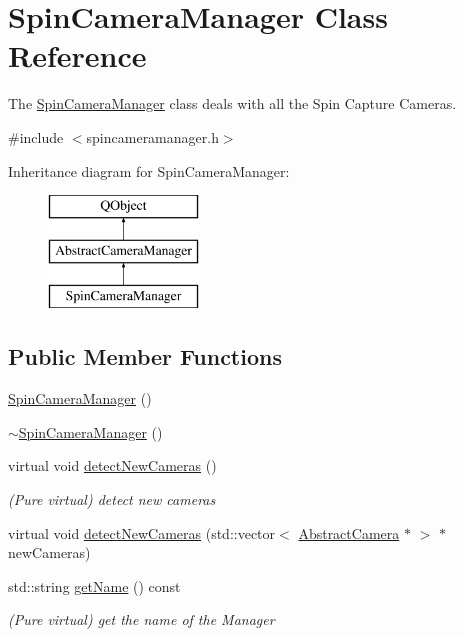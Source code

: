 \hypertarget{class_spin_camera_manager}{}\section{Spin\+Camera\+Manager Class Reference}
\label{class_spin_camera_manager}


The \mbox{\hyperlink{class_spin_camera_manager}{Spin\+Camera\+Manager}} class deals with all the Spin Capture Cameras.  




{\ttfamily \#include $<$spincameramanager.\+h$>$}

Inheritance diagram for Spin\+Camera\+Manager\+:\begin{figure}[H]
\begin{center}
\leavevmode
\includegraphics[height=3.000000cm]{class_spin_camera_manager}
\end{center}
\end{figure}
\subsection*{Public Member Functions}
\begin{DoxyCompactItemize}
\item 
\mbox{\hyperlink{class_spin_camera_manager_a8931fe8336705233c818f216f0e0d235}{Spin\+Camera\+Manager}} ()
\item 
\mbox{\hyperlink{class_spin_camera_manager_a1e1e60eb35671a981b884dde99484253}{$\sim$\+Spin\+Camera\+Manager}} ()
\item 
virtual void \mbox{\hyperlink{class_spin_camera_manager_affc9edfd215e7dd1ad050cd111906863}{detect\+New\+Cameras}} ()
\begin{DoxyCompactList}\small\item\em (Pure virtual) detect new cameras \end{DoxyCompactList}\item 
virtual void \mbox{\hyperlink{class_spin_camera_manager_a6586a44c68b7e37a0992819af7711cc7}{detect\+New\+Cameras}} (std\+::vector$<$ \mbox{\hyperlink{class_abstract_camera}{Abstract\+Camera}} $\ast$ $>$ $\ast$new\+Cameras)
\item 
std\+::string \mbox{\hyperlink{class_spin_camera_manager_ac3ea32324ae75d80e9b1e3108ee9c6d2}{get\+Name}} () const
\begin{DoxyCompactList}\small\item\em (Pure virtual) get the name of the Manager \end{DoxyCompactList}\end{DoxyCompactItemize}
